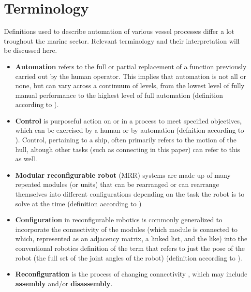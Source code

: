
\section{Terminology}
\label{literatureDefinitions}
Definitions used to describe automation of various vessel processes differ a lot troughout the marine sector. Relevant terminology and their interpretation will be discussed here. 

\begin{itemize}
	\item \textbf{Automation} refers to the full or partial replacement of a function previously carried out by the human operator. This implies that automation is not all or none, but can vary across a continuum of levels, from the lowest level of fully manual performance to the highest level of full automation (definition according to \citet{parasuraman2000model}).
	
	\item \textbf{Control} is purposeful action on or in a process to meet specified objectives, which can be exercised by a human or by automation (defnition according to \cite{IMO103ISORegulatoryScopingExMass}). Control, pertaining to a ship, often primarily refers to the motion of the hull, altough other tasks (such as connecting in this paper) can refer to this as well.  
	
	\item \textbf{Modular reconfigurable robot} (MRR) systems are made up of many repeated modules (or units) that can be rearranged or can rearrange themselves into different configurations depending on the task the robot is to solve at the time (definition according to \citet{seo2019modular})
	
	\item \textbf{Configuration} in reconfigurable robotics is commonly generalized to incorporate the connectivity of the modules (which module is connected to which, represented as an adjacency matrix, a linked list, and the like) into the conventional robotics definition of the term that refers to just the pose of the robot (the full set of the joint angles of the	robot) (definition according to \citet{seo2019modular}).
	
	\item \textbf{Reconfiguration} is the process of changing connectivity \citet{seo2019modular}, which may include \textbf{assembly} and/or \textbf{disassembly}.
	

\end{itemize}
